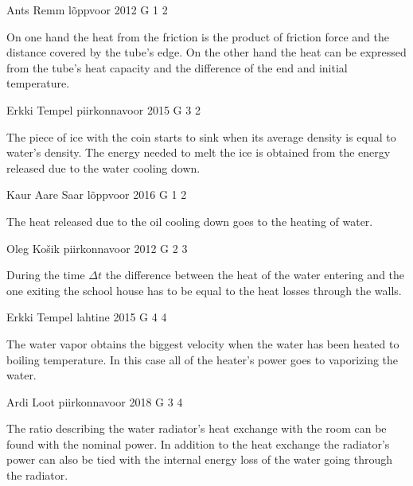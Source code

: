 \documentclass[11pt]{article}
\begin{document}
{Ants Remm} %
{lõppvoor} %
{2012} %
{G 1} %
{2} %
{

\ifEngHint
On one hand the heat from the friction is the product of friction force and the distance covered by the tube’s edge. On the other hand the heat can be expressed from the tube’s heat capacity and the difference of the end and initial temperature.
\fi
}

{Erkki Tempel} %
{piirkonnavoor} %
{2015} %
{G 3} %
{2} %
{

\ifEngHint
The piece of ice with the coin starts to sink when its average density is equal to water’s density. The energy needed to melt the ice is obtained from the energy released due to the water cooling down.
\fi
}

{Kaur Aare Saar} %
{lõppvoor} %
{2016} %
{G 1} %
{2} %
{

\ifEngHint
The heat released due to the oil cooling down goes to the heating of water.
\fi
}

{Oleg Košik} %
{piirkonnavoor} %
{2012} %
{G 2} %
{3} %
{

\ifEngHint
During the time $\Delta t$ the difference between the heat of the water entering and the one exiting the school house has to be equal to the heat losses through the walls.
\fi
}

{Erkki Tempel} %
{lahtine} %
{2015} %
{G 4} %
{4} %
{

\ifEngHint
The water vapor obtains the biggest velocity when the water has been heated to boiling temperature. In this case all of the heater’s power goes to vaporizing the water.
\fi
}

{Ardi Loot} %
{piirkonnavoor} %
{2018} %
{G 3} %
{4} %
{

\ifEngHint
The ratio describing the water radiator’s heat exchange with the room can be found with the nominal power. In addition to the heat exchange the radiator’s power can also be tied with the internal energy loss of the water going through the radiator. 
\fi
}
\end{document}
